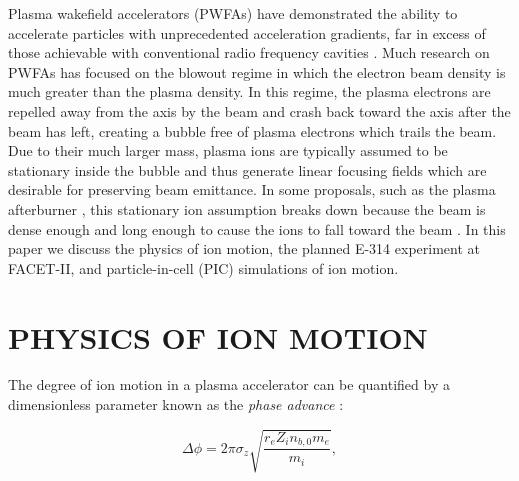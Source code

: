 \documentclass{aac}
\begin{document}
Plasma wakefield accelerators (PWFAs) have demonstrated the ability to accelerate particles with unprecedented acceleration gradients, far in excess of those achievable with conventional radio frequency cavities \cite{nature}. Much research on PWFAs has focused on the blowout regime \cite{jamieblowout} in which the electron beam density is much greater than the plasma density. In this regime, the plasma electrons are repelled away from the axis by the beam and crash back toward the axis after the beam has left, creating a bubble free of plasma electrons which trails the beam. Due to their much larger mass, plasma ions are typically assumed to be stationary inside the bubble and thus generate linear focusing fields which are desirable for preserving beam emittance. In some proposals, such as the plasma afterburner \cite{afterburner1,afterburner2}, this stationary ion assumption breaks down because the beam is dense enough and long enough to cause the ions to fall toward the beam \cite{jamieionmotioncalc}. In this paper we discuss the physics of ion motion, the planned E-314 experiment at FACET-II, and particle-in-cell (PIC) simulations of ion motion.

\section{PHYSICS OF ION MOTION}

The degree of ion motion in a plasma accelerator can be quantified by a dimensionless parameter known as the \textit{phase advance} \cite{jamieionmotioncalc}:

\begin{equation} \label{eq:phaseadvance}
\Delta \phi = 2 \pi  \sigma_z \sqrt{\frac{r_e Z_i n_{b,0} m_e}{m_i}},
\end{equation}
\end{document}
